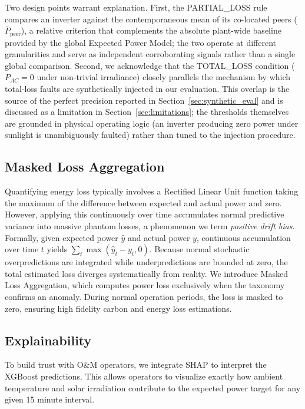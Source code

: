 \documentclass[11pt,a4paper,twoside]{article}
\begin{document}
Two design points warrant explanation. First, the PARTIAL\_LOSS rule compares an inverter against the contemporaneous mean of its co-located peers ($\bar{P}_{\text{peer}}$), a relative criterion that complements the absolute plant-wide baseline provided by the global Expected Power Model; the two operate at different granularities and serve as independent corroborating signals rather than a single global comparison. Second, we acknowledge that the TOTAL\_LOSS condition ($P_{AC}=0$ under non-trivial irradiance) closely parallels the mechanism by which total-loss faults are synthetically injected in our evaluation. This overlap is the source of the perfect precision reported in Section~\ref{sec:synthetic_eval} and is discussed as a limitation in Section~\ref{sec:limitations}; the thresholds themselves are grounded in physical operating logic (an inverter producing zero power under sunlight is unambiguously faulted) rather than tuned to the injection procedure.

\subsection{Masked Loss Aggregation}
Quantifying energy loss typically involves a Rectified Linear Unit function taking the maximum of the difference between expected and actual power and zero. However, applying this continuously over time accumulates normal predictive variance into massive phantom losses, a phenomenon we term \textit{positive drift bias}. Formally, given expected power $\hat{y}$ and actual power $y$, continuous accumulation over time $t$ yields $\sum_{t} \max(\hat{y}_t - y_t, 0)$. Because normal stochastic overpredictions are integrated while underpredictions are bounded at zero, the total estimated loss diverges systematically from reality. We introduce Masked Loss Aggregation, which computes power loss exclusively when the taxonomy confirms an anomaly. During normal operation periods, the loss is masked to zero, ensuring high fidelity carbon and energy loss estimations.

\subsection{Explainability}
To build trust with O\&M operators, we integrate SHAP \cite{lundberg2017} to interpret the XGBoost predictions. This allows operators to visualize exactly how ambient temperature and solar irradiation contribute to the expected power target for any given 15 minute interval.
\end{document}
